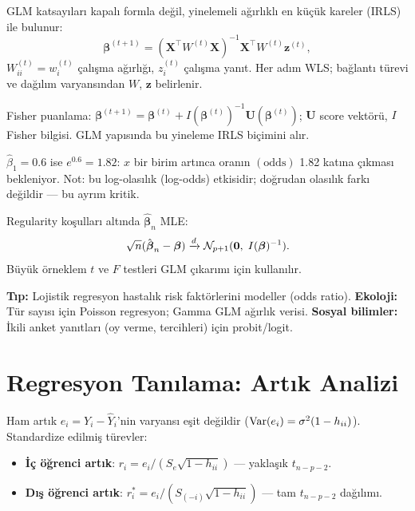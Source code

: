 \begin{teorem}\label{thm:glm_mle}
GLM katsayıları kapalı formla değil, yinelemeli ağırlıklı en küçük kareler (IRLS) ile bulunur:
\[
  \boldsymbol\beta^{(t+1)} = (\mathbf{X}^\top W^{(t)}\mathbf{X})^{-1}\mathbf{X}^\top W^{(t)}\mathbf{z}^{(t)},
\]
$W_{ii}^{(t)} = w_i^{(t)}$ çalışma ağırlığı, $z_i^{(t)}$ çalışma yanıt. Her adım WLS; bağlantı türevi ve dağılım varyansından $W$, $\mathbf{z}$ belirlenir.
\end{teorem}

\begin{ispatiskele}
Fisher puanlama: $\boldsymbol\beta^{(t+1)}=\boldsymbol\beta^{(t)}+I(\boldsymbol\beta^{(t)})^{-1}\mathbf{U}(\boldsymbol\beta^{(t)})$; $\mathbf{U}$ score vektörü, $I$ Fisher bilgisi. GLM yapısında bu yineleme IRLS biçimini alır.
\end{ispatiskele}

\begin{ornek}
$\hat\beta_1=0.6$ ise $e^{0.6}=1.82$: $x$ bir birim artınca oranın $(\text{odds})$ 1.82 katına çıkması bekleniyor. Not: bu log-olasılık (log-odds) etkisidir; doğrudan olasılık farkı değildir --- bu ayrım kritik.
\end{ornek}

\begin{teorem}\label{thm:glm_asimptotik}
Regularity koşulları altında $\hat{\boldsymbol\beta}_n$ MLE:
\[
  \sqrt{n}(\hat{\boldsymbol\beta}_n-\boldsymbol\beta) \xrightarrow{d} \mathcal{N}_{p+1}(\mathbf{0},\; I(\boldsymbol\beta)^{-1}).
\]
Büyük örneklem $t$ ve $F$ testleri GLM çıkarımı için kullanılır.
\end{teorem}

\begin{disiplinlerarasibaglan}
\textbf{Tıp:} Lojistik regresyon hastalık risk faktörlerini modeller (odds ratio). \textbf{Ekoloji:} Tür sayısı için Poisson regresyon; Gamma GLM ağırlık verisi. \textbf{Sosyal bilimler:} İkili anket yanıtları (oy verme, tercihleri) için probit/logit.
\end{disiplinlerarasibaglan}

\section{Regresyon Tanılama: Artık Analizi}
\label{sec:artik_analiz}

\begin{tanim}\label{def:artik_turleri}
Ham artık $e_i=Y_i-\hat Y_i$'nin varyansı eşit değildir ($\operatorname{Var}(e_i)=\sigma^2(1-h_{ii})$). Standardize edilmiş türevler:
\begin{itemize}
  \item \textbf{İç öğrenci artık}: $r_i=e_i/(S_e\sqrt{1-h_{ii}})$ --- yaklaşık $t_{n-p-2}$.
  \item \textbf{Dış öğrenci artık}: $r_i^*=e_i/(S_{(-i)}\sqrt{1-h_{ii}})$ --- tam $t_{n-p-2}$ dağılımı.
\end{itemize}
\end{tanim}

